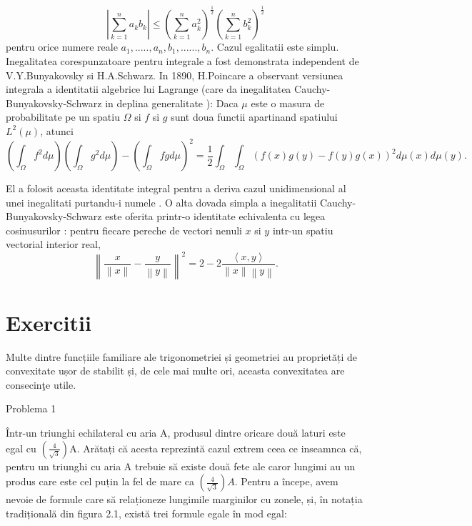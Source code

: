 \documentclass[a4paper,12pt,oneside]{report}
\begin{document}
\begin{displaymath}
  \left | \sum_{k = 1}^{n} a_{k}b_{k} \right |\leq \left ( \sum_{k = 1}^{n}a_{k}^{2} \right )^{\frac{1}{2}}\left ( \sum_{k = 1}^{n}b_{k}^{2} \right )^{\frac{1}{2}}
\end{displaymath}
pentru orice numere reale \(a_{1},.....,a_{n}, b_{1},......, b_{n}\). Cazul egalitatii este simplu. Inegalitatea corespunzatoare pentru integrale a fost demonstrata independent de V.Y.Bunyakovsky si H.A.Schwarz. 
	In 1890, H.Poincare a observant versiunea integrala a identitatii algebrice lui Lagrange (care da inegalitatea Cauchy-Bunyakovsky-Schwarz in deplina generalitate ): Daca \(\mu\) este o masura de probabilitate pe un spatiu \(\Omega\) si \(f\) si \(g\) sunt doua functii apartinand spatiului \(L^{2}\left ( \mu  \right )\), atunci 
\begin{displaymath}
  \left (\int_{\Omega}f^{2}d\mu \right )\left (\int_{\Omega}g^{2}d\mu \right ) - \left (\int_{\Omega}fgd\mu \right )^{2} = \frac{1}{2}\int_{\Omega}\int_{\Omega}\left ( f\left ( x \right )g\left ( y \right ) - f\left ( y \right )g\left ( x \right )\right )^{2}d\mu \left ( x \right )d\mu \left ( y \right ).
\end{displaymath}
	
	El a folosit aceasta identitate integral pentru a deriva cazul unidimensional al unei inegalitati purtandu-i numele . O alta dovada simpla a inegalitatii Cauchy-Bunyakovsky-Schwarz este oferita printr-o identitate echivalenta cu legea cosinusurilor : pentru fiecare pereche de vectori nenuli \(x\) si \(y\) intr-un spatiu vectorial interior real, 
\begin{displaymath}
  \left \| \frac{x}{\left \| x \right \|} - \frac{y}{\left \| y \right \|}\right \|^{2} = 2 - 2\frac{\left \langle x , y \right \rangle}{\left \| x \right \|\left \| y \right \|}. 
\end{displaymath}



%
%
%
%


\chapter{Exercitii}

Multe dintre funcțiile familiare ale trigonometriei și geometriei au proprietăți de convexitate ușor de stabilit și, de cele mai multe ori, aceasta convexitatea are consecinţe utile.

Problema 1 

Într-un triunghi echilateral cu aria A, produsul dintre oricare două laturi este egal cu \(\left (\frac{4}{\sqrt{3}}  \right )\)A. Arătați că acesta reprezintă cazul extrem ceea ce inseamnca că, pentru un triunghi cu aria A trebuie să existe două fete ale caror lungimi au un produs care este cel puțin la fel de mare ca \(\left (\frac{4}{\sqrt{3}}  \right )A\).
	Pentru a începe, avem nevoie de formule care să relaționeze lungimile marginilor cu zonele, și, în notația tradițională din figura 2.1, există trei formule egale în mod egal:
\end{document}
